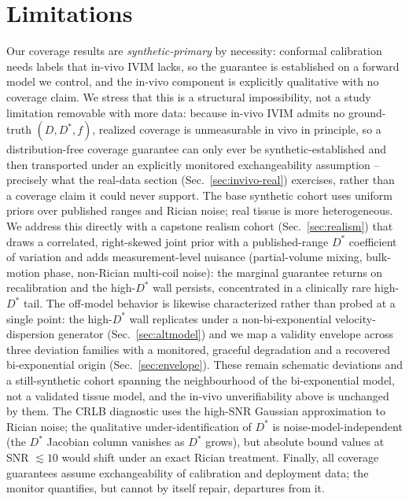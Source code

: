 \documentclass[11pt]{article}
\newcommand{\Dstar}{D^{*}}
\begin{document}
\section{Limitations}
Our coverage results are \emph{synthetic-primary} by necessity: conformal
calibration needs labels that in-vivo IVIM lacks, so the guarantee is established
on a forward model we control, and the in-vivo component is explicitly qualitative
with no coverage claim. We stress that this is a structural impossibility, not a
study limitation removable with more data: because in-vivo IVIM admits no
ground-truth $(D,\Dstar,f)$, realized coverage is unmeasurable in vivo in
principle, so a distribution-free coverage guarantee can only ever be
synthetic-established and then transported under an explicitly monitored
exchangeability assumption -- precisely what the real-data section
(Sec.~\ref{sec:invivo-real}) exercises, rather than a coverage claim it could never
support. The base synthetic cohort uses uniform priors over published
ranges and Rician noise; real tissue is more heterogeneous. We address this directly
with a capstone realism cohort (Sec.~\ref{sec:realism}) that draws a correlated,
right-skewed joint prior with a published-range $\Dstar$ coefficient of variation and
adds measurement-level nuisance (partial-volume mixing, bulk-motion phase, non-Rician
multi-coil noise): the marginal guarantee returns on recalibration and the
high-$\Dstar$ wall persists, concentrated in a clinically rare high-$\Dstar$ tail.
The off-model behavior is likewise characterized rather than probed at a single
point: the high-$\Dstar$ wall replicates under a non-bi-exponential
velocity-dispersion generator (Sec.~\ref{sec:altmodel}) and we map a validity
envelope across three deviation families with a monitored, graceful degradation and a
recovered bi-exponential origin (Sec.~\ref{sec:envelope}). These remain schematic
deviations and a still-synthetic cohort spanning the neighbourhood of the
bi-exponential model, not a validated tissue model, and the in-vivo unverifiability
above is unchanged by them. The
CRLB diagnostic uses the high-SNR Gaussian approximation to Rician noise; the
qualitative under-identification of $\Dstar$ is noise-model-independent (the
$\Dstar$ Jacobian column vanishes as $\Dstar$ grows), but absolute bound values at
SNR $\lesssim10$ would shift under an exact Rician treatment. Finally, all coverage
guarantees assume exchangeability of calibration and deployment data; the monitor
quantifies, but cannot by itself repair, departures from it.
\end{document}

